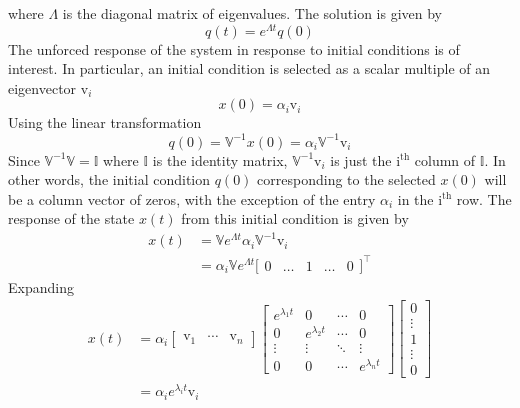 where $\Lambda$ is the diagonal matrix of eigenvalues.
The solution is given by
\begin{equation}
  q(t)=e^{\Lambda{t}}q(0)
\end{equation}
The unforced response of the system in response to initial conditions is of interest.
In particular, an initial condition is selected as a scalar multiple of an eigenvector $\mathrm{v}_{i}$
\begin{equation}
  x(0)=\alpha_{i}\mathrm{v}_{i}
\end{equation}
Using the linear transformation
\begin{equation}
  q(0)=\mathbb{V}^{-1}x(0)=\alpha_{i}\mathbb{V}^{-1}\mathrm{v}_{i}
\end{equation}
Since $\mathbb{V}^{-1}\mathbb{V}=\mathbb{I}$ where $\mathbb{I}$ is the identity matrix, $\mathbb{V}^{-1}\mathrm{v}_{i}$ is just the $\mathrm{i^{th}}$ column of $\mathbb{I}$.
In other words, the initial condition $q(0)$ corresponding to the selected $x(0)$ will be a column vector of zeros, with the exception of the entry $\alpha_{i}$ in the $\mathrm{i^{th}}$ row.
The response of the state $x(t)$ from this initial condition is given by
\begin{equation}
  \begin{split}
    x(t)&=\mathbb{V}e^{\Lambda{t}}\alpha_{i}\mathbb{V}^{-1}\mathrm{v}_{i} \\
    &=\alpha_{i}\mathbb{V}e^{\Lambda{t}}
    \bigr[
    \begin{array}{ccccc}
      0 & \hdots & 1 & \hdots & 0
    \end{array}\bigr]^{\top}
  \end{split}
\end{equation}
Expanding
\begin{equation}
  \begin{split}
    x(t)&=\alpha_{i}
    \left[
    \begin{array}{ccc}
      \mathrm{v}_{1} & \cdots & \mathrm{v}_{n}
    \end{array} \right]
    \left[
    \begin{array}{cccc}
      e^{\lambda_{1}t} & 0 & \cdots & 0 \\
      0 & e^{\lambda_{2}t} & \cdots & 0 \\
      \vdots & \vdots & \ddots & \vdots \\
      0 & 0 & \cdots & e^{\lambda_{n}t}
    \end{array}\right]
    \begin{bmatrix}
      0 \\
      \vdots \\
      1 \\
      \vdots \\
      0
    \end{bmatrix} \\
    &=\alpha_{i}e^{\lambda_{i}t}\mathrm{v}_{i}
  \end{split}
\end{equation}
